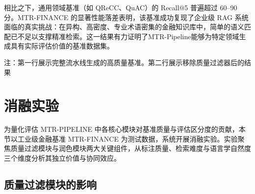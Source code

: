 相比之下，通用领域基准（如 QReCC、QuAC）的 Recall@5 普遍超过 60--90 分。MTR-FINANCE 的显著性能落差表明，该基准成功复现了企业级 RAG 系统面临的真实挑战：在异构、高密度、专业术语密集的金融知识库中，简单的语义匹配已不足以支撑精准检索。这一结果有力证明了MTR-Pipeline能够为特定领域生成具有实际评估价值的基准数据集。




\begin{table}[t]
\centering
{}
\label{tab:finance_ablation}
\setlength{\tabcolsep}{3.5pt} %


\parbox{\linewidth}{\footnotesize 注：第一行展示完整流水线生成的高质量基准。第二行展示移除质量过滤器后的结果}
\end{table}


\section{消融实验}
\label{sec:ablation_study}

为量化评估 MTR-PIPELINE 中各核心模块对基准质量与评估区分度的贡献，本节以工业级金融基准 MTR-FINANCE 为测试数据，系统开展消融实验。实验聚焦质量过滤模块与润色模块两大关键组件，从标注质量、检索难度与语言学自然度三个维度分析其独立价值与协同效应。

\subsection{质量过滤模块的影响}
\label{subsec:filter_ablation}


